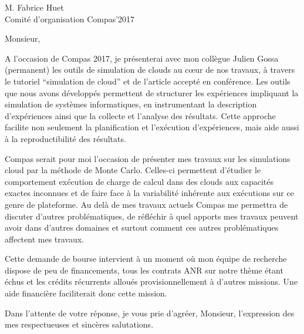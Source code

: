 \documentclass{letter}
\begin{document}
\begin{letter}{M. Fabrice Huet \\ Comité d'organisation Compas'2017}

\opening{Monsieur,}

	A l'occasion de  Compas 2017, je présenterai avec mon collègue Julien
	Gossa (permanent) les outils de simulation de clouds au c\oe{}ur de nos
	travaux, à travers le tutoriel ``simulation de cloud'' et de l'article
	accepté en conférence.  Les outils  que nous avons  développés
	permettent de structurer  les expériences impliquant  la  simulation  de
	systèmes  informatiques,  en  instrumentant  la description
	d'expériences   ainsi   que   la   collecte   et   l'analyse   des
	résultats. Cette approche facilite non seulement la planification et
	l'exécution d'expériences, mais aide aussi à la reproductibilité des
	résultats.

	Compas serait pour moi l'occasion de présenter mes travaux sur les
	simulations cloud par la méthode de Monte Carlo. Celles-ci permettent
	d'étudier le comportement exécution de charge de calcul dans des clouds
	aux capacités exactes inconnues et de faire face à la variabilité
	inhérente aux exécutions sur ce genre de plateforme. Au delà de mes
	travaux actuels Compas me permettra de discuter d'autres problématiques,
	de réfléchir à quel apports mes travaux peuvent avoir dans d'autres
	domaines et surtout comment ces autres problématiques affectent mes
	travaux.

	Cette demande de bourse intervient à un moment où mon équipe de recherche
	dispose de peu de financements, tous les contrats ANR sur notre thème
	étant échus et les crédits récurrents alloués provisionnellement à
	d'autres missions. Une aide financière faciliterait donc cette mission.
	


\closing{Dans l'attente de votre réponse, je vous prie d'agréer, Monsieur,
l'expression des mes respectueuses et sincères salutations.}


\end{letter}
\end{document}
